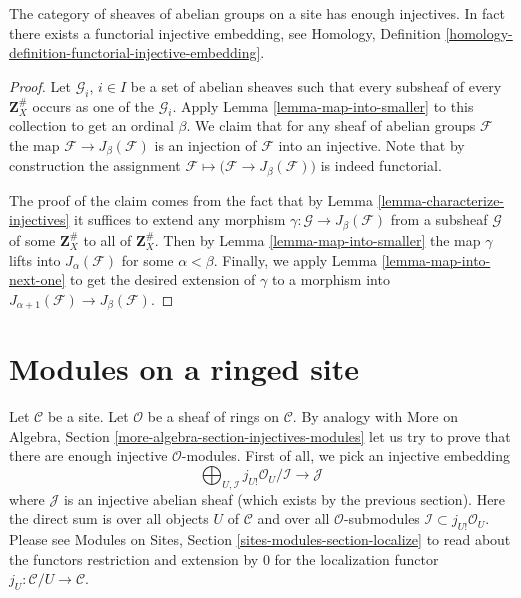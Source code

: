 \begin{theorem}
\label{theorem-sheaves-injectives}
The category of sheaves of abelian groups on a
site has enough injectives. In fact there exists
a functorial injective embedding, see
Homology, Definition \ref{homology-definition-functorial-injective-embedding}.
\end{theorem}

\begin{proof}
Let $\mathcal{G}_i$, $i \in I$ be a set of abelian
sheaves such that every subsheaf of every $\mathbf{Z}_X^\#$
occurs as one of the $\mathcal{G}_i$. Apply
Lemma \ref{lemma-map-into-smaller} to this collection to
get an ordinal $\beta$. We claim that for any sheaf of abelian
groups $\mathcal{F}$ the map $\mathcal{F} \to J_\beta(\mathcal{F})$
is an injection of $\mathcal{F}$ into an injective.
Note that by construction the assignment
$\mathcal{F} \mapsto \big(\mathcal{F} \to J_\beta(\mathcal{F})\big)$
is indeed functorial.

\medskip\noindent
The proof of the claim comes from the fact that by
Lemma \ref{lemma-characterize-injectives} it suffices to extend any
morphism $\gamma : \mathcal{G} \to J_\beta(\mathcal{F})$
from a subsheaf $\mathcal{G}$ of some $\mathbf{Z}_X^\#$ to all of
$\mathbf{Z}_X^\#$. Then by Lemma \ref{lemma-map-into-smaller} the
map $\gamma$ lifts into $J_\alpha(\mathcal{F})$ for some
$\alpha < \beta$. Finally, we apply Lemma \ref{lemma-map-into-next-one}
to get the desired extension of $\gamma$ to a morphism
into $J_{\alpha + 1}(\mathcal{F}) \to J_\beta(\mathcal{F})$.
\end{proof}






\section{Modules on a ringed site}
\label{section-sheaves-modules}

\noindent
Let $\mathcal{C}$ be a site.
Let $\mathcal{O}$ be a sheaf of rings on $\mathcal{C}$.
By analogy with
More on Algebra, Section \ref{more-algebra-section-injectives-modules}
let us try to prove that there are enough injective
$\mathcal{O}$-modules. First of all, we pick an injective
embedding
$$
\bigoplus\nolimits_{U, \mathcal{I}}
j_{U!}\mathcal{O}_U/\mathcal{I}
\longrightarrow
\mathcal{J}
$$
where $\mathcal{J}$ is an injective abelian sheaf (which
exists by the previous section). Here the direct sum is
over all objects $U$ of $\mathcal{C}$ and over all
$\mathcal{O}$-submodules $\mathcal{I} \subset j_{U!}\mathcal{O}_U$.
Please see
Modules on Sites, Section \ref{sites-modules-section-localize}
to read about the functors restriction and
extension by $0$ for the localization functor
$j_U : \mathcal{C}/U \to \mathcal{C}$.


